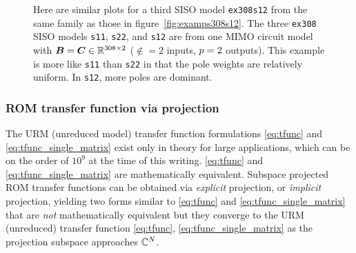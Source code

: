 \begin{figure}[htb]
\centering
{}

\hfill
{} 
\medskip

\hfill
{} 
\caption{Here are similar plots for a third SISO model \texttt{ex308s12} from the same family as those in figure~\ref{fig:examps308s12}.  The three \texttt{ex308} SISO models \texttt{s11}, \texttt{s22}, and \texttt{s12} are from one MIMO circuit model with $\bm{B}=\bm{C}\in\mathbb{R}^{308 \times 2}$ ($\nin=2$ inputs, $p=2$ outputs).   This example is more like \texttt{s11} than \texttt{s22} in that the pole weights are relatively uniform.  In \texttt{s12}, more poles are dominant.}
\end{figure}
\clearpage




\subsubsection{ROM transfer function via projection }\label{sec:projected_ROMs}
The URM (unreduced model) transfer function formulations \eqref{eq:tfunc} and \eqref{eq:tfunc_single_matrix} exist only in theory for large applications, which can be on the order of $10^9$ at the time of this writing.    \eqref{eq:tfunc} and \eqref{eq:tfunc_single_matrix} are mathematically equivalent.  Subspace projected ROM transfer functions can be obtained via \emph{explicit} projection, or \emph{implicit} projection, yielding two forms similar to \eqref{eq:tfunc} and \eqref{eq:tfunc_single_matrix} that are \emph{not} mathematically equivalent but they converge to the  URM (unreduced) transfer function \eqref{eq:tfunc}, \eqref{eq:tfunc_single_matrix} as the projection subspace approaches $\mathbb{C}^N$.

